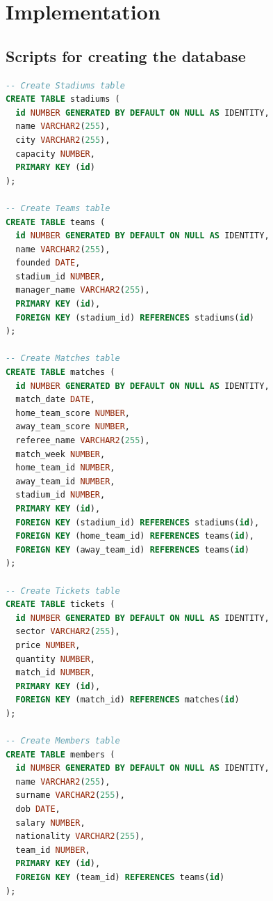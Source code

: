 \documentclass[11pt]{article}
\begin{document}
\clearpage

\section{Implementation}
\subsection{Scripts for creating the database}
\begin{lstlisting}[language=SQL, caption=\small Scripts creating the database (\texttt{DBTableCreation.sql} file)]
-- Create Stadiums table
CREATE TABLE stadiums (
  id NUMBER GENERATED BY DEFAULT ON NULL AS IDENTITY,
  name VARCHAR2(255),
  city VARCHAR2(255),
  capacity NUMBER,
  PRIMARY KEY (id)
);

-- Create Teams table
CREATE TABLE teams (
  id NUMBER GENERATED BY DEFAULT ON NULL AS IDENTITY,
  name VARCHAR2(255),
  founded DATE,
  stadium_id NUMBER,
  manager_name VARCHAR2(255),
  PRIMARY KEY (id),
  FOREIGN KEY (stadium_id) REFERENCES stadiums(id)
);

-- Create Matches table
CREATE TABLE matches (
  id NUMBER GENERATED BY DEFAULT ON NULL AS IDENTITY,
  match_date DATE,
  home_team_score NUMBER,
  away_team_score NUMBER,
  referee_name VARCHAR2(255),
  match_week NUMBER,
  home_team_id NUMBER,
  away_team_id NUMBER,
  stadium_id NUMBER,
  PRIMARY KEY (id),
  FOREIGN KEY (stadium_id) REFERENCES stadiums(id),
  FOREIGN KEY (home_team_id) REFERENCES teams(id),
  FOREIGN KEY (away_team_id) REFERENCES teams(id)
);

-- Create Tickets table
CREATE TABLE tickets (
  id NUMBER GENERATED BY DEFAULT ON NULL AS IDENTITY,
  sector VARCHAR2(255),
  price NUMBER,
  quantity NUMBER,
  match_id NUMBER,
  PRIMARY KEY (id),
  FOREIGN KEY (match_id) REFERENCES matches(id)
);

-- Create Members table
CREATE TABLE members (
  id NUMBER GENERATED BY DEFAULT ON NULL AS IDENTITY,
  name VARCHAR2(255),
  surname VARCHAR2(255),
  dob DATE,
  salary NUMBER,
  nationality VARCHAR2(255),
  team_id NUMBER,
  PRIMARY KEY (id),
  FOREIGN KEY (team_id) REFERENCES teams(id)
);
\end{lstlisting}
\end{document}

